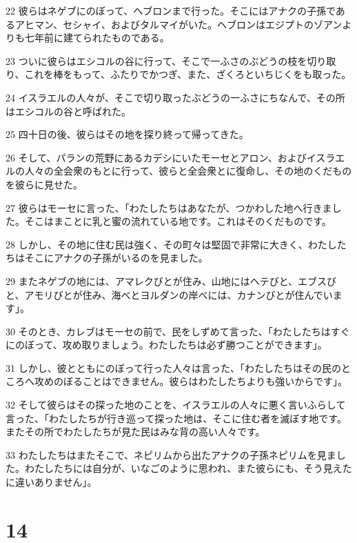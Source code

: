 \par 22 彼らはネゲブにのぼって、ヘブロンまで行った。そこにはアナクの子孫であるアヒマン、セシャイ、およびタルマイがいた。ヘブロンはエジプトのゾアンよりも七年前に建てられたものである。
\par 23 ついに彼らはエシコルの谷に行って、そこで一ふさのぶどうの枝を切り取り、これを棒をもって、ふたりでかつぎ、また、ざくろといちじくをも取った。
\par 24 イスラエルの人々が、そこで切り取ったぶどうの一ふさにちなんで、その所はエシコルの谷と呼ばれた。
\par 25 四十日の後、彼らはその地を探り終って帰ってきた。
\par 26 そして、パランの荒野にあるカデシにいたモーセとアロン、およびイスラエルの人々の全会衆のもとに行って、彼らと全会衆とに復命し、その地のくだものを彼らに見せた。
\par 27 彼らはモーセに言った、「わたしたちはあなたが、つかわした地へ行きました。そこはまことに乳と蜜の流れている地です。これはそのくだものです。
\par 28 しかし、その地に住む民は強く、その町々は堅固で非常に大きく、わたしたちはそこにアナクの子孫がいるのを見ました。
\par 29 またネゲブの地には、アマレクびとが住み、山地にはヘテびと、エブスびと、アモリびとが住み、海べとヨルダンの岸べには、カナンびとが住んでいます」。
\par 30 そのとき、カレブはモーセの前で、民をしずめて言った、「わたしたちはすぐにのぼって、攻め取りましょう。わたしたちは必ず勝つことができます」。
\par 31 しかし、彼とともにのぼって行った人々は言った、「わたしたちはその民のところへ攻めのぼることはできません。彼らはわたしたちよりも強いからです」。
\par 32 そして彼らはその探った地のことを、イスラエルの人々に悪く言いふらして言った、「わたしたちが行き巡って探った地は、そこに住む者を滅ぼす地です。またその所でわたしたちが見た民はみな背の高い人々です。
\par 33 わたしたちはまたそこで、ネピリムから出たアナクの子孫ネピリムを見ました。わたしたちには自分が、いなごのように思われ、また彼らにも、そう見えたに違いありません」。

\chapter{14}


